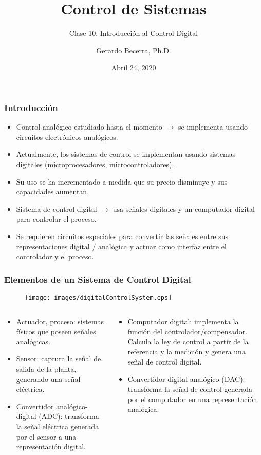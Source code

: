 \documentclass[aspectratio=169]{beamer}
\title{Control de Sistemas}
\subtitle{\small Clase 10: Introducción al Control Digital}
\author{Gerardo Becerra, Ph.D.}
\institute{Pontificia Universidad Javeriana\\ Departamento de Electrónica}
\date{Abril 24, 2020}
\theoremstyle{definition}
\theoremstyle{plain}
\theoremstyle{remark}
\begin{document}
\frame{\titlepage}	

\begin{frame}[<+->]\frametitle{Introducción}
\centering
\begin{itemize}
	\item Control analógico estudiado hasta el momento $\rightarrow$ se implementa usando circuitos electrónicos analógicos.
	\item Actualmente, los sistemas de control se implementan usando sistemas digitales (microprocesadores, microcontroladores).
	\item Su uso se ha incrementado a medida que su precio disminuye y sus capacidades aumentan.
	\item Sistema de control digital $\rightarrow$ usa señales digitales y un computador digital para controlar el proceso.
	\item Se requieren circuitos especiales para convertir las señales entre sus representaciones digital / analógica y actuar como interfaz entre el controlador y el proceso.
\end{itemize}
\end{frame}

\begin{frame}[<+->]\frametitle{Elementos de un Sistema de Control Digital}
	\begin{figure}[h]
		\centering
		\texttt{[image: images/digitalControlSystem.eps]}
	\end{figure}
	\small
	\vspace*{-2mm}
	\begin{columns}
		\begin{column}{0.5\textwidth}
			\begin{itemize}
				\item Actuador, proceso: sistemas físicos que poseen señales analógicas.
				\item Sensor: captura la señal de salida de la planta, generando una señal eléctrica.
				\item Convertidor analógico-digital (ADC): transforma la señal eléctrica generada por el sensor a una representación digital.
			\end{itemize}
		\end{column}
		\begin{column}{0.5\textwidth}
			\begin{itemize}
				\item Computador digital: implementa la función del controlador/compensador. Calcula la ley de control a partir de la referencia y la medición y genera una señal de control digital.
				\item Convertidor digital-analógico (DAC): transforma la señal de control generada por el computador en una representación analógica.
			\end{itemize}
		\end{column}
	\end{columns}
\end{frame}
\end{document}
